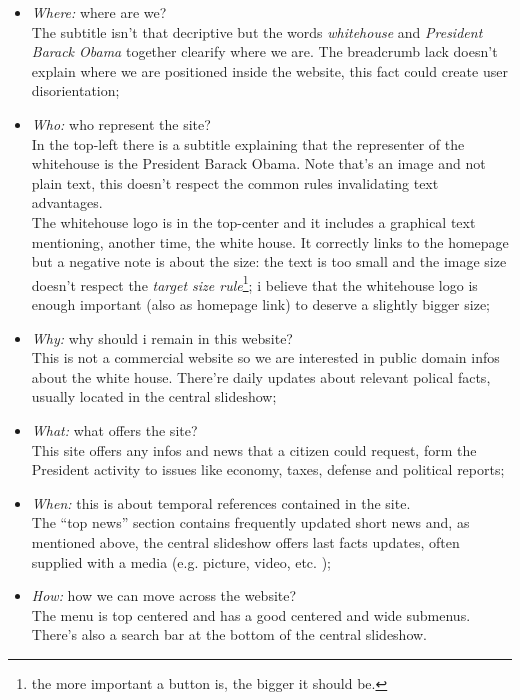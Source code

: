 \documentclass[
12pt, %
a4paper, %
oneside, %
headinclude,footinclude, %
BCOR5mm, %
]{scrartcl}
\begin{document}
\begin{itemize}%
	\item \textit{Where:} where are we? \\ The subtitle isn't that decriptive but the words \emph{whitehouse} and \emph{President Barack Obama} together clearify where we are. The breadcrumb lack doesn't explain where we are positioned inside the website, this fact could create user disorientation;

	\item \textit{Who:} who represent the site? \\ In the top-left there is a subtitle explaining that the representer of the whitehouse is the President Barack Obama. Note that's an image and not plain text, this doesn't respect the common rules invalidating text advantages. \\
	The whitehouse logo is in the top-center and it includes a graphical text mentioning, another time, the white house. It correctly links to the homepage but a negative note is about the size: the text is too small and the image size doesn't respect the \emph{target size rule}\footnote{the more important a button is, the bigger it should be.}; i believe that the whitehouse logo is enough important (also as homepage link) to deserve a slightly bigger size;

	\item \textit{Why:} why should i remain in this website? \\ This is not a commercial website so we are interested in public domain infos about the white house. There're daily updates about relevant polical facts, usually located in the central slideshow;

	\item \textit{What:} what offers the site? \\ This site offers any infos and news that a citizen could request, form the President activity to issues like economy, taxes, defense and political reports;

	\item \textit{When:} this is about temporal references contained in the site. \\ The ``top news'' section contains frequently updated short news and, as mentioned above, the central slideshow offers last facts updates, often supplied with a media (e.g. picture, video, etc. ); 

	\item \textit{How:} how we can move across the website? \\ The menu is top centered and has a good centered and wide submenus. There's also a search bar at the bottom of the central slideshow.

\end{itemize}
\end{document}
